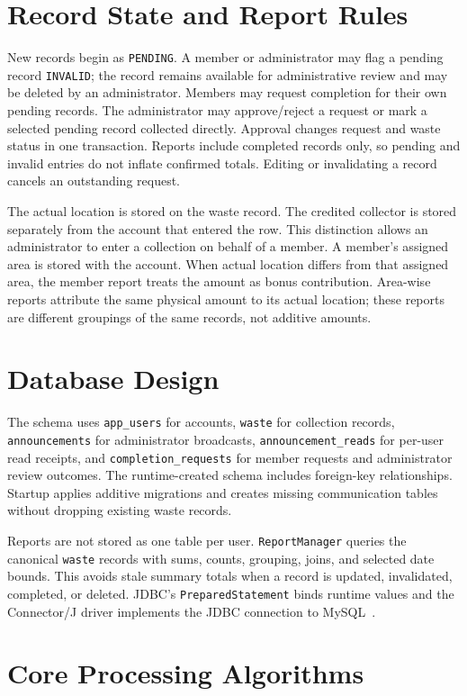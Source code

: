 \documentclass[12pt,a4paper]{report}
\begin{document}
\section{Record State and Report Rules}
New records begin as \texttt{PENDING}. A member or administrator may flag a pending record \texttt{INVALID}; the record remains available for administrative review and may be deleted by an administrator. Members may request completion for their own pending records. The administrator may approve/reject a request or mark a selected pending record collected directly. Approval changes request and waste status in one transaction. Reports include completed records only, so pending and invalid entries do not inflate confirmed totals. Editing or invalidating a record cancels an outstanding request.

The actual location is stored on the waste record. The credited collector is stored separately from the account that entered the row. This distinction allows an administrator to enter a collection on behalf of a member. A member's assigned area is stored with the account. When actual location differs from that assigned area, the member report treats the amount as bonus contribution. Area-wise reports attribute the same physical amount to its actual location; these reports are different groupings of the same records, not additive amounts.

\section{Database Design}
The schema uses \texttt{app\_users} for accounts, \texttt{waste} for collection records, \texttt{announcements} for administrator broadcasts, \texttt{announcement\_reads} for per-user read receipts, and \texttt{completion\_requests} for member requests and administrator review outcomes. The runtime-created schema includes foreign-key relationships. Startup applies additive migrations and creates missing communication tables without dropping existing waste records.

Reports are not stored as one table per user. \texttt{ReportManager} queries the canonical \texttt{waste} records with sums, counts, grouping, joins, and selected date bounds. This avoids stale summary totals when a record is updated, invalidated, completed, or deleted. JDBC's \texttt{PreparedStatement} binds runtime values and the Connector/J driver implements the JDBC connection to MySQL~\cite{oraclePrepared, mysqlConnector}.

\section{Core Processing Algorithms}
\end{document}

